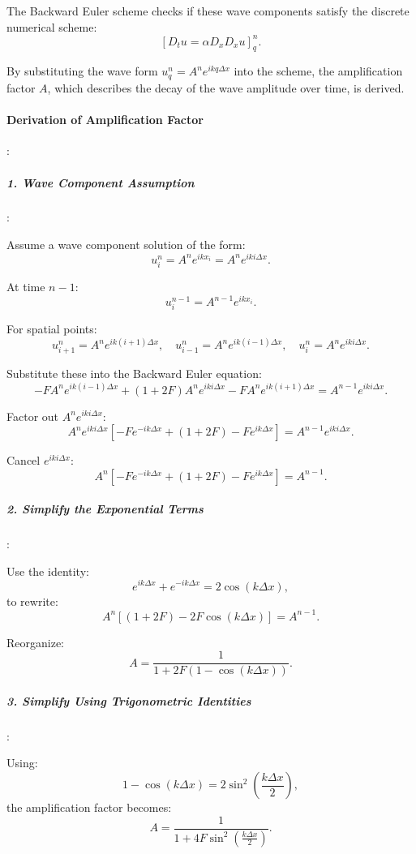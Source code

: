 \documentclass{article}
\begin{document}
			The Backward Euler scheme checks if these wave components satisfy the discrete numerical scheme:
			\[
			[D_t u = \alpha D_x D_x u]_q^n.
			\]
			
			By substituting the wave form \( u_q^n = A^n e^{i k q \Delta x} \) into the scheme, the amplification factor \( A \), which describes the decay of the wave amplitude over time, is derived.
			
			\paragraph{Derivation of Amplification Factor}:
			
			\subparagraph{1. Wave Component Assumption}:
			
			Assume a wave component solution of the form:
			\[
			u_i^n = A^n e^{i k x_i} = A^n e^{i k i \Delta x}.
			\]
			
			At time \( n-1 \):
			\[
			u_i^{n-1} = A^{n-1} e^{i k x_i}.
			\]
			
			For spatial points:
			\[
			u_{i+1}^n = A^n e^{i k (i+1) \Delta x}, \quad
			u_{i-1}^n = A^n e^{i k (i-1) \Delta x}, \quad
			u_i^n = A^n e^{i k i \Delta x}.
			\]
			
			Substitute these into the Backward Euler equation:
			\[
			-F A^n e^{i k (i-1) \Delta x} + (1 + 2F) A^n e^{i k i \Delta x} - F A^n e^{i k (i+1) \Delta x} = A^{n-1} e^{i k i \Delta x}.
			\]
			
			Factor out \( A^n e^{i k i \Delta x} \):
			\[
			A^n e^{i k i \Delta x} \left[ -F e^{-i k \Delta x} + (1 + 2F) - F e^{i k \Delta x} \right] = A^{n-1} e^{i k i \Delta x}.
			\]
			
			Cancel \( e^{i k i \Delta x} \):
			\[
			A^n \left[ -F e^{-i k \Delta x} + (1 + 2F) - F e^{i k \Delta x} \right] = A^{n-1}.
			\]
			
			\subparagraph{2. Simplify the Exponential Terms}:
			
			Use the identity:
			\[
			e^{i k \Delta x} + e^{-i k \Delta x} = 2 \cos(k \Delta x),
			\]
			to rewrite:
			\[
			A^n \left[ (1 + 2F) - 2F \cos(k \Delta x) \right] = A^{n-1}.
			\]
			
			Reorganize:
			\[
			A = \frac{1}{1 + 2F (1 - \cos(k \Delta x))}.
			\]
			
			\subparagraph{3. Simplify Using Trigonometric Identities}:
			
			Using:
			\[
			1 - \cos(k \Delta x) = 2 \sin^2\left(\frac{k \Delta x}{2}\right),
			\]
			the amplification factor becomes:
			\[
			A = \frac{1}{1 + 4F \sin^2\left(\frac{k \Delta x}{2}\right)}.
			\]
			
\end{document}
